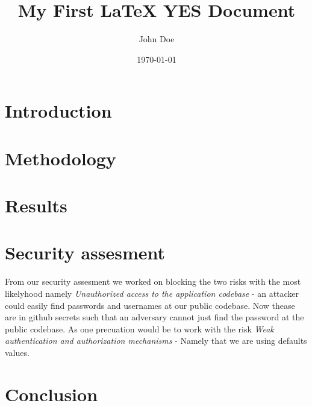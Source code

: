 \documentclass{article}
\title{My First LaTeX YES Document}
\author{John Doe}
\date{\today}
\begin{document}
\maketitle

\section{Introduction}

\lipsum[1]

\section{Methodology}

\lipsum[2]

\section{Results}

\lipsum[3]
\section{Security assesment}
From our security assesment we worked on blocking the two risks with the most likelyhood namely \textit{Unauthorized access to the application codebase}
- an attacker could easily find passwords and usernames at our public codebase. Now thease are in github secrets such that an adversary cannot just 
find the password at the public codebase. As one precuation would be to work with the risk \textit{Weak authentication and authorization mechanisms}
 - Namely that we are using defaults values. 


\section{Conclusion}

\lipsum[4]
\end{document}
